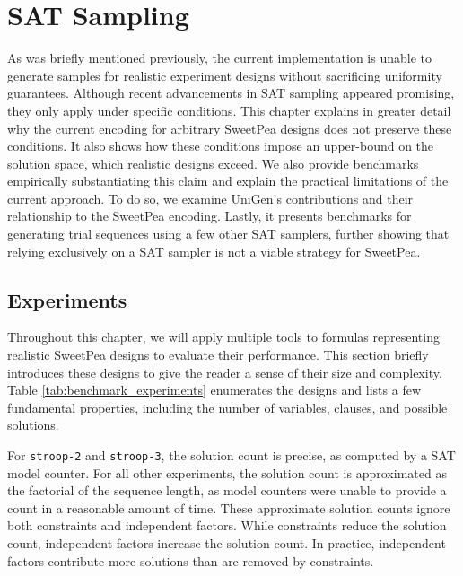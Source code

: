 
\chapter{SAT Sampling}

As was briefly mentioned previously, the current implementation is unable to generate samples for realistic experiment designs without sacrificing uniformity guarantees. Although recent advancements in SAT sampling appeared promising, they only apply under specific conditions. This chapter explains in greater detail why the current encoding for arbitrary SweetPea designs does not preserve these conditions. It also shows how these conditions impose an upper-bound on the solution space, which realistic designs exceed. We also provide benchmarks empirically substantiating this claim and explain the practical limitations of the current approach. To do so, we examine UniGen's contributions and their relationship to the SweetPea encoding. Lastly, it presents benchmarks for generating trial sequences using a few other SAT samplers, further showing that relying exclusively on a SAT sampler is not a viable strategy for SweetPea.


\section{Experiments}

Throughout this chapter, we will apply multiple tools to formulas representing realistic SweetPea designs to evaluate their performance. This section briefly introduces these designs to give the reader a sense of their size and complexity. Table \ref{tab:benchmark_experiments} enumerates the designs and lists a few fundamental properties, including the number of variables, clauses, and possible solutions.

For \texttt{stroop-2} and \texttt{stroop-3}, the solution count is precise, as computed by a SAT model counter. For all other experiments, the solution count is approximated as the factorial of the sequence length, as model counters were unable to provide a count in a reasonable amount of time. These approximate solution counts ignore both constraints and independent factors. While constraints reduce the solution count, independent factors increase the solution count. In practice, independent factors contribute more solutions than are removed by constraints.

